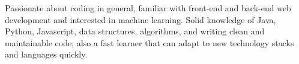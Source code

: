 

\begin{cvparagraph}

Passionate about coding in general, familiar with front-end and back-end web development and interested in machine learning. Solid knowledge of Java, Python, Javascript, data structures, algorithms, and writing clean and maintainable code; also a fast learner that can adapt to new technology stacks and languages quickly.
\end{cvparagraph}
